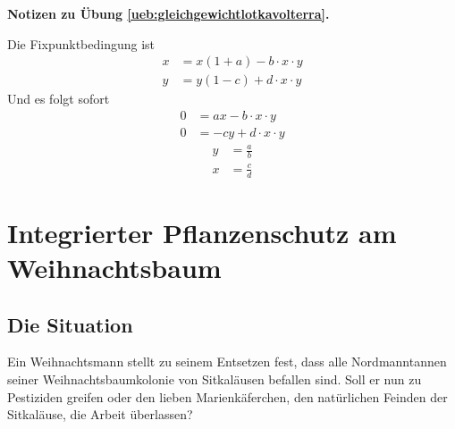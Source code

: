 \documentclass[%
11pt,%
twoside,%
titlepage,%
german,%
headsepline%
]{scrartcl}
\newcommand{\concatueb}[1]{ueb:#1}%
\newcommand{\concatlsg}[1]{lsg:#1}%
\newenvironment{lsg}[1]{%
    \par\noindent\textbf{Notizen zu Übung \ref{\concatueb{#1}}.}%
    \label{\concatlsg{#1}}
}{%
    \par%
}
\begin{document}
\begin{lsg}{gleichgewichtlotkavolterra}
Die Fixpunktbedingung ist
\begin{align*}
x &= x(1+a)-b\cdot x\cdot y\\
y &= y(1-c)+d\cdot x\cdot y
\end{align*}
Und es folgt sofort
\begin{align*}
0 &= ax-b\cdot x\cdot y\\
0 &= -cy+d\cdot x\cdot y
\end{align*}
\begin{align*}
y &= \frac{a}{b}\\
x &= \frac{c}{d}
\end{align*}
\end{lsg}

\clearpage




\clearpage

\section{Integrierter Pflanzenschutz am Weihnachtsbaum}
\subsection{Die Situation}
Ein Weihnachtsmann stellt zu seinem Entsetzen fest, dass alle Nordmanntannen seiner Weihnachtsbaumkolonie von Sitkaläusen befallen sind. Soll er nun zu Pestiziden greifen oder den lieben Marienkäferchen, den natürlichen Feinden der Sitkaläuse, die Arbeit überlassen?
\\[2ex]
\end{document}
